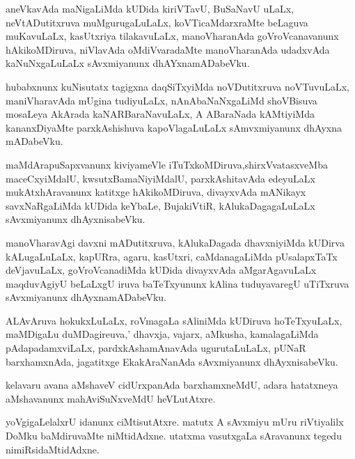 \documentclass{article}
\begin{document}
\begin{mn}%
aneVkavAda maNigaLiMda kUDida kiriVTavU, BuSaNavU uLaLx, neVtADutitxruva muMgurugaLuLaLx, 
koVTicaMdarxraMte beLaguva muKavuLaLx, kasUtxriya tilakavuLaLx, manoVharanAda  
goVroVcanavanunx hAkikoMDiruva, niVlavAda oMdiVvaradaMte manoVharanAda udadxvAda 
kaNuNxgaLuLaLx sAvxmiyanunx dhAYxnamADabeVku.
\end{mn}

\begin{mn}%
hubabxnunx kuNisutatx tagigxna daqSiTxyiMda noVDutitxruva noVTuvuLaLx, maniVharavAda mUgina 
tudiyuLaLx, nAnAbaNaNxgaLiMd shoVBisuva mosaLeya AkArada kaNARBaraNavuLaLx, A ABaraNada 
kAMtiyiMda kananxDiyaMte parxkAshishuva kapoVlagaLuLaLx sAmvxmiyanunx dhAyxna mADabeVku.
\end{mn}

\begin{mn}%
maMdArapuSapxvanunx kiviyameVle iTuTxkoMDiruva,shirxVvatasxveMba maceCxyiMdalU, 
kwsutxBamaNiyiMdalU, parxkAshitavAda edeyuLaLx mukAtxhAravanunx katitxge hAkikoMDiruva, 
divayxvAda mANikayx savxNaRgaLiMda kUDida keYbaLe, BujakiVtiR, kAlukaDagagaLuLaLx 
sAvxmiyanunx dhAyxnisabeVku.
\end{mn}

\begin{mn}%
manoVharavAgi davxni mADutitxruva, kAlukaDagada dhavxniyiMda kUDirva kALugaLuLaLx, 
kapURra, agaru, kasUtxri, caMdanagaLiMda  pUsalapxTaTx deVjavuLaLx, goVroVcanadiMda kUDida 
divayxvAda aMgarAgavuLaLx maqduvAgiyU beLaLxgU iruva baTeTxyununx kAlina tuduyavaregU 
uTiTxruva sAvxmiyanunx dhAyxnamADabeVku.
\end{mn}

\begin{mn}%
ALAvAruva hokukxLuLaLx, roVmagaLa sAliniMda kUDiruva hoTeTxyuLaLx, maMDigaLu duMDagireuva,'
dhavxja, vajarx, aMkusha, kamalagaLiMda pAdapadamxviLaLx, pardxkAshamAnavAda ugurutaLuLaLx, 
pUNaR barxhamxnAda, jagatitxge EkakAraNanAda sAvxmiyanunx dhAyxnisabeVku.
\end{mn}

\begin{mn}%
kelavaru avana aMshaveV cidUrxpanAda barxhamxneMdU, adara hatatxneya aMshavanunx 
mahAviSuNxveMdU heVLutAtxre.
\end{mn}

\begin{mn}%
yoVgigaLelalxrU idanunx ciMtisutAtxre. matutx A sAvxmiyu mUru riVtiyalilx DoMku baMdiruvaMte 
niMtidAdxne. utatxma vasutxgaLa sAravanunx  tegedu nimiRsidaMtidAdxne.
\end{mn}
\end{document}
